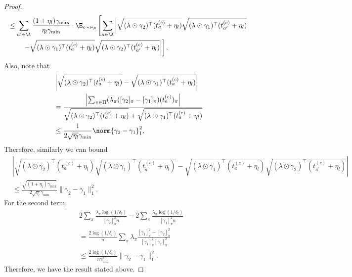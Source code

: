 \documentclass{article}
\newcommand{\1}{\mathbf{1}}
\begin{document}
\begin{proof}
{\begin{align*}
    &\leq \sum_{a^{\prime} \in \A}\frac{(1+\eta_l)\gamma_{\max}}{\eta_l\gamma_{\min}} \cdot\E_{c\sim\nu_\D}\left[\sum_{a \in \A} \left|\sqrt{(\lambda\odot\gamma_{2})^{\top} (t_{a}^{(c)}+\eta_l)}\sqrt{(\lambda\odot\gamma_{1})^{\top} (t_{a^{\prime}}^{(c)}+\eta_l)}\right.\right.\nonumber\\
    &\qquad\left.\left.-\sqrt{(\lambda\odot\gamma_{1})^{\top} (t_{a}^{(c)}+\eta_l)}\sqrt{(\lambda\odot\gamma_{2})^{\top} (t_{a^{\prime}}^{(c)}+\eta_l)}\right|\right].
\end{align*}
}
Also, note that 
\begin{align*}
    &\left|\sqrt{(\lambda\odot\gamma_{2})^{\top} (t_{a}^{(c)}+\eta_l)}-\sqrt{(\lambda\odot\gamma_{1})^{\top} (t_{a}^{(c)}+\eta_l)}\right|\\
    &= \frac{\left|\sum_{\pi\in\Pi}(\lambda_\pi([\gamma_2]_\pi-[\gamma_1]_\pi)(t_a^{(c)})_\pi\right|}{\sqrt{(\lambda\odot\gamma_{2})^{\top} (t_{a}^{(c)}+\eta_l)}+\sqrt{(\lambda\odot\gamma_{1})^{\top} (t_{a}^{(c)}+\eta_l)}}\\
    &\leq \frac{1}{2\sqrt{\eta_l}\gamma_{\min}}\norm{\gamma_2-\gamma_1}_1^2,
\end{align*}
Therefore, similarly we can bound 
\begin{align*}
    &\left|\sqrt{(\lambda\odot\gamma_{2})^{\top} (t_{a}^{(c)}+\eta_l)}\sqrt{(\lambda\odot\gamma_{1})^{\top} (t_{a^{\prime}}^{(c)}+\eta_l)}-\sqrt{(\lambda\odot\gamma_{1})^{\top} (t_{a}^{(c)}+\eta_l)}\sqrt{(\lambda\odot\gamma_{2})^{\top} (t_{a^{\prime}}^{(c)}+\eta_l)}\right|\\
    &\leq \frac{\sqrt{(1+\eta_l)\gamma_{\max}}}{2\sqrt{\eta_l}\gamma_{\min}}\|\gamma_2-\gamma_1\|_1^2.
\end{align*}
For the second term, 
\begin{align*}
    &2\sum_{\pi}\frac{\lambda_\pi\log(1/\delta_l)}{[\gamma_2]_\pi^2 n}-2\sum_{\pi}\frac{\lambda_\pi\log(1/\delta_l)}{[\gamma_1]_\pi^2 n} \\
    &= \frac{2\log(1/\delta_l)}{n}\sum_{\pi}\lambda_\pi\frac{[\gamma_1]_\pi^2-[\gamma_2]_\pi^2}{[\gamma_1]_\pi^2[\gamma_2]_\pi^2}\\
    &\leq \frac{2\log(1/\delta_l)}{n\gamma_{\min}^3}\|\gamma_2-\gamma_1\|_1^2.
\end{align*}
Therefore, we have the result stated above. 
\end{proof}
\end{document}
